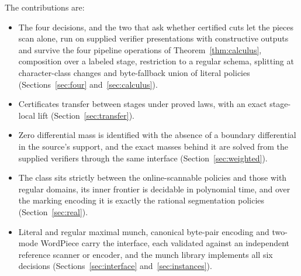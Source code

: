 \documentclass[11pt,a4paper]{article}
\theoremstyle{definition}
\theoremstyle{plain}
\begin{document}
The contributions are:

\begin{itemize}
\item The four decisions, and the two that ask whether certified cuts let the pieces scan alone, run on supplied
verifier presentations with constructive outputs and survive the four pipeline operations of Theorem~\ref{thm:calculus},
composition over a labeled stage, restriction to a regular schema, splitting at character-class changes and
byte-fallback union of literal policies (Sections~\ref{sec:four} and~\ref{sec:calculus}).
\item Certificates transfer between stages under proved laws, with an exact stage-local lift
(Section~\ref{sec:transfer}).
\item Zero differential mass is identified with the absence of a boundary differential in the source's support, and the
exact masses behind it are solved from the supplied verifiers through the same interface (Section~\ref{sec:weighted}).
\item The class sits strictly between the online-scannable policies and those with regular domains, its inner frontier
is decidable in polynomial time, and over the marking encoding it is exactly the rational segmentation policies
(Section~\ref{sec:real}).
\item Literal and regular maximal munch, canonical byte-pair encoding and two-mode WordPiece carry the interface, each
validated against an independent reference scanner or encoder, and the munch library implements all six decisions
(Sections~\ref{sec:interface} and~\ref{sec:instances}).
\end{itemize}
\end{document}
